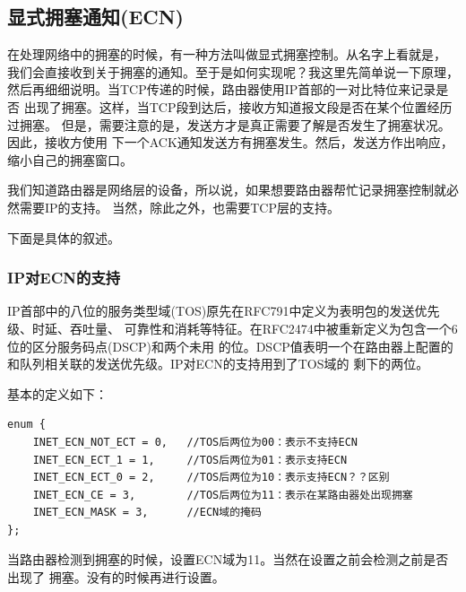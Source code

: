     \subsection{显式拥塞通知(ECN)}
        在处理网络中的拥塞的时候，有一种方法叫做显式拥塞控制。从名字上看就是，
        我们会直接收到关于拥塞的通知。至于是如何实现呢？我这里先简单说一下原理，
        然后再细细说明。当TCP传递的时候，路由器使用IP首部的一对比特位来记录是否
        出现了拥塞。这样，当TCP段到达后，接收方知道报文段是否在某个位置经历过拥塞。
        但是，需要注意的是，发送方才是真正需要了解是否发生了拥塞状况。因此，接收方使用
        下一个ACK通知发送方有拥塞发生。然后，发送方作出响应，缩小自己的拥塞窗口。

        我们知道路由器是网络层的设备，所以说，如果想要路由器帮忙记录拥塞控制就必然需要IP的支持。
        当然，除此之外，也需要TCP层的支持。

        下面是具体的叙述。

        \subsubsection{IP对ECN的支持}

            IP首部中的八位的服务类型域(TOS)原先在RFC791中定义为表明包的发送优先级、时延、吞吐量、
            可靠性和消耗等特征。在RFC2474中被重新定义为包含一个6位的区分服务码点(DSCP)和两个未用
            的位。DSCP值表明一个在路由器上配置的和队列相关联的发送优先级。IP对ECN的支持用到了TOS域的
            剩下的两位。

            基本的定义如下：
\begin{verbatim}
enum {
    INET_ECN_NOT_ECT = 0,   //TOS后两位为00：表示不支持ECN
    INET_ECN_ECT_1 = 1,     //TOS后两位为01：表示支持ECN
    INET_ECN_ECT_0 = 2,     //TOS后两位为10：表示支持ECN？？区别
    INET_ECN_CE = 3,        //TOS后两位为11：表示在某路由器处出现拥塞
    INET_ECN_MASK = 3,      //ECN域的掩码
};
\end{verbatim}


            当路由器检测到拥塞的时候，设置ECN域为11。当然在设置之前会检测之前是否出现了
            拥塞。没有的时候再进行设置。

